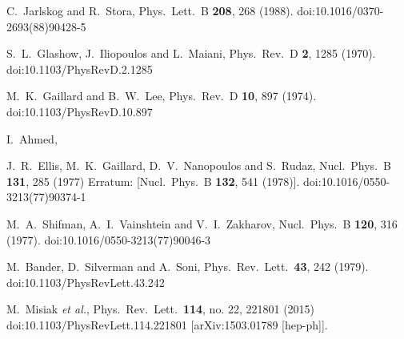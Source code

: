 \begin{thebibliography}{99}
  C.~Jarlskog and R.~Stora,
  Phys.\ Lett.\ B {\bf 208}, 268 (1988).
  doi:10.1016/0370-2693(88)90428-5
  
  S.~L.~Glashow, J.~Iliopoulos and L.~Maiani,
  Phys.\ Rev.\ D {\bf 2}, 1285 (1970).
  doi:10.1103/PhysRevD.2.1285

  M.~K.~Gaillard and B.~W.~Lee,
  Phys.\ Rev.\ D {\bf 10}, 897 (1974).
  doi:10.1103/PhysRevD.10.897
  
  I.~Ahmed,
  
  J.~R.~Ellis, M.~K.~Gaillard, D.~V.~Nanopoulos and S.~Rudaz,
  Nucl.\ Phys.\ B {\bf 131}, 285 (1977)
  Erratum: [Nucl.\ Phys.\ B {\bf 132}, 541 (1978)].
  doi:10.1016/0550-3213(77)90374-1
  
  M.~A.~Shifman, A.~I.~Vainshtein and V.~I.~Zakharov,
  Nucl.\ Phys.\ B {\bf 120}, 316 (1977).
  doi:10.1016/0550-3213(77)90046-3

  M.~Bander, D.~Silverman and A.~Soni,
  Phys.\ Rev.\ Lett.\  {\bf 43}, 242 (1979).
  doi:10.1103/PhysRevLett.43.242

  M.~Misiak {\it et al.},
  Phys.\ Rev.\ Lett.\  {\bf 114}, no. 22, 221801 (2015)
  doi:10.1103/PhysRevLett.114.221801
  [arXiv:1503.01789 [hep-ph]].
  

\end{thebibliography}
